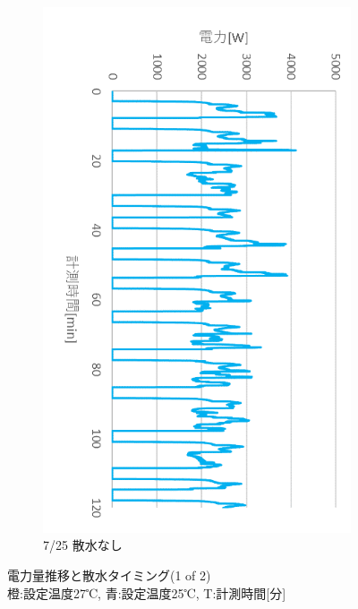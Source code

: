 \documentclass[a4j,fleqn,dvipdfmx,uplatex]{jsarticle}
\begin{document}
\begin{figure}[htb]
\begin{subfigure}[t]{0.32\linewidth}
      \includegraphics[width=\linewidth]{img/t_p/20220725.png}
      \caption{7/25 散水なし}\label{fig:f}
  \end{subfigure}
  \caption{電力量推移と散水タイミング(1 of 2) \\ \small 橙:設定温度27℃, 青:設定温度25℃, T:計測時間[分]}\label{fig:ex_outputs_1/2}
\end{figure}
\end{document}

